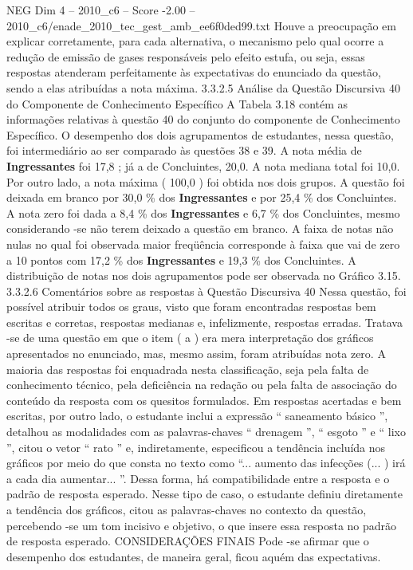 \begin{textsample}{NEG Dim 4 – 2010\_c6 – Score -2.00 – 2010\_c6/enade\_2010\_tec\_gest\_amb\_ee6f0ded99.txt}
Houve a preocupação em explicar corretamente, para cada alternativa, o mecanismo pelo qual ocorre a redução de emissão de gases responsáveis pelo efeito estufa, ou seja, essas respostas atenderam perfeitamente às expectativas do enunciado da questão, sendo a elas atribuídas a nota máxima. 3.3.2.5 Análise da Questão Discursiva 40 do Componente de Conhecimento Específico A Tabela 3.18 contém as informações relativas à questão 40 do conjunto do componente de Conhecimento Específico.
O desempenho dos dois agrupamentos de estudantes, nessa questão, foi intermediário ao ser comparado às questões 38 e 39.
A nota média de \textbf{Ingressantes} foi 17,8 ; já a de Concluintes, 20,0.
A nota mediana total foi 10,0.
Por outro lado, a nota máxima ( 100,0 ) foi obtida nos dois grupos.
A questão foi deixada em branco por 30,0 \% dos \textbf{Ingressantes} e por 25,4 \% dos Concluintes.
A nota zero foi dada a 8,4 \% dos \textbf{Ingressantes} e 6,7 \% dos Concluintes, mesmo considerando -se não terem deixado a questão em branco.
A faixa de notas não nulas no qual foi observada maior freqüência corresponde à faixa que vai de zero a 10 pontos com 17,2 \% dos \textbf{Ingressantes} e 19,3 \% dos Concluintes.
A distribuição de notas nos dois agrupamentos pode ser observada no Gráfico 3.15. 3.3.2.6 Comentários sobre as respostas à Questão Discursiva 40 Nessa questão, foi possível atribuir todos os graus, visto que foram encontradas respostas bem escritas e corretas, respostas medianas e, infelizmente, respostas erradas.
Tratava -se de uma questão em que o item ( a ) era mera interpretação dos gráficos apresentados no enunciado, mas, mesmo assim, foram atribuídas nota zero.
A maioria das respostas foi enquadrada nesta classificação, seja pela falta de conhecimento técnico, pela deficiência na redação ou pela falta de associação do conteúdo da resposta com os quesitos formulados.
Em respostas acertadas e bem escritas, por outro lado, o estudante inclui a expressão “ saneamento básico ”, detalhou as modalidades com as palavras-chaves “ drenagem ”, “ esgoto ” e “ lixo ”, citou o vetor “ rato ” e, indiretamente, especificou a tendência incluída nos gráficos por meio do que consta no texto como “... aumento das infecções (... ) irá a cada dia aumentar... ”.
Dessa forma, há compatibilidade entre a resposta e o padrão de resposta esperado.
Nesse tipo de caso, o estudante definiu diretamente a tendência dos gráficos, citou as palavras-chaves no contexto da questão, percebendo -se um tom incisivo e objetivo, o que insere essa resposta no padrão de resposta esperado.
CONSIDERAÇÕES FINAIS Pode -se afirmar que o desempenho dos estudantes, de maneira geral, ficou aquém das expectativas.

\end{textsample}
